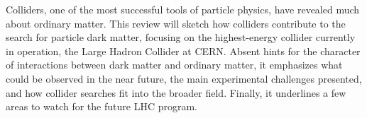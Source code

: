 Colliders, one of the most successful tools of particle physics, have revealed much about ordinary matter.
This review will sketch how colliders contribute to the search for particle dark matter, focusing on the highest-energy collider currently in operation, the Large Hadron Collider at CERN.
Absent hints for the character of interactions between dark matter and ordinary matter, it emphasizes what could be observed in the near future, the main experimental challenges presented, and how collider searches fit into the broader field.
Finally, it underlines a few areas to watch for the future LHC program.
